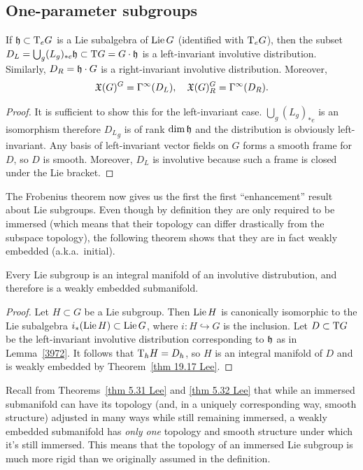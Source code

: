 \subsection{One-parameter subgroups}


\begin{lem}\label{3972}
    If $\mathfrak{h}\subset \mathrm{T}_e G$ is a Lie subalgebra of $\operatorname{Lie} G$ (identified with $\mathrm{T}_eG$), then the subset $D_L=\bigcup_g (L_g)_{\ast e}\mathfrak{h}\subset \mathrm{T} G=G\cdot \mathfrak{h}$ is a left-invariant involutive distribution. Similarly, $D_R=\mathfrak{h}\cdot G$ is a right-invariant involutive distribution. Moreover,
    \[\mathfrak{X}(G)^G=\Gamma^\infty(D_L),\quad \mathfrak{X}(G)^G_R=\Gamma^\infty(D_R).\]
\end{lem}
\begin{proof}
    It is sufficient to show this for the left-invariant case.
    $\bigcup_g (L_g)_{\ast e}$ is an isomorphism therefore ${D_L}_g$ is of rank $\dim \mathfrak{h}$ and the distribution is obviously left-invariant. Any basis of left-invariant vector fields on $G$ forms a smooth frame for $D$, so $D$ is smooth. Moreover, $D_L$ is involutive because such a frame is closed under the Lie bracket.
\end{proof}

The Frobenius theorem now gives us the first the first ``enhancement'' result about Lie subgroups. Even though by definition they are only required to be immersed (which means that their topology can differ drastically from the subspace topology), the following theorem shows that they are in fact weakly embedded (a.k.a.~initial).

\begin{thm}\label{thm 19.25 Lee}
    Every Lie subgroup is an integral manifold of an involutive distrubution, and therefore is a weakly embedded submanifold.
\end{thm}
\begin{proof}
    Let $H\subset G$ be a Lie subgroup. Then $\operatorname{Lie} H$ is canonically isomorphic to the Lie subalgebra $i_\ast(\operatorname{Lie} H)\subset \operatorname{Lie} G$, where $i:H\hookrightarrow G$ is the inclusion. Let $D\subset \mathrm{T} G$ be the left-invariant involutive distribution corresponding to $\mathfrak{h}$ as in Lemma~\ref{3972}. It follows that $\mathrm{T}_hH=D_h$, so $H$ is an integral manifold of $D$ and is weakly embedded by Theorem~\ref{thm 19.17 Lee}.
\end{proof}

Recall from Theorems~\ref{thm 5.31 Lee} and \ref{thm 5.32 Lee} that while an immersed submanifold can have its topology (and, in a uniquely corresponding way, smooth structure) adjusted in many ways while still remaining immersed, a weakly embedded submanifold has \emph{only one} topology and smooth structure under which it's still immersed. This means that the topology of an immersed Lie subgroup is much more rigid than we originally assumed in the definition.

